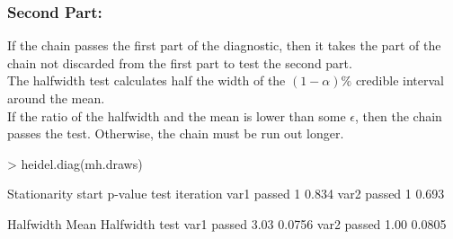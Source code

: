 \documentclass{beamer}
\begin{document}
\begin{frame}[fragile]
\frametitle{Second Part:}
\pause
If the chain passes the first part of the diagnostic, then it takes
the part of the chain not discarded from the first part to test the second part.\\
\bigskip
\pause
The halfwidth test calculates half the width of the $(1-\alpha)\%$
credible interval around the mean.  \\
\bigskip
\pause
If the ratio of the halfwidth and the mean is lower than some
$\epsilon$, then the chain passes the test.  Otherwise, the chain must
be run out longer.
\pause
\bigskip
\tiny
\begin{Schunk}
\begin{Sinput}
> heidel.diag(mh.draws)
\end{Sinput}
\begin{Soutput}
     Stationarity start     p-value
     test         iteration        
var1 passed       1         0.834  
var2 passed       1         0.693  
                             
     Halfwidth Mean Halfwidth
     test                    
var1 passed    3.03 0.0756   
var2 passed    1.00 0.0805   
\end{Soutput}
\end{Schunk}
\normalsize 
\end{frame}
\end{document}
